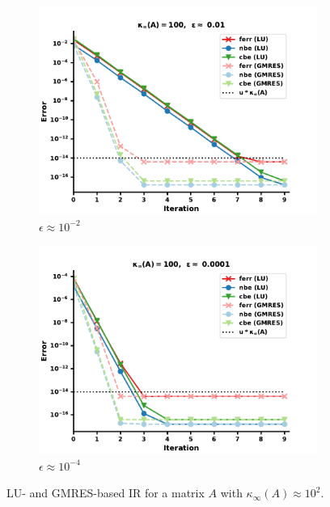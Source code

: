 \begin{figure}
\centering
\begin{subfigure}{.5\textwidth}
  \centering
  \includegraphics[width=\linewidth]{chapters/5_experiments/figures/LR512e0_0.pdf}
  \caption{$\epsilon \approx 10^{-2}$}
  \label{fig:lrir1_1}
\end{subfigure}%
\begin{subfigure}{.5\textwidth}
  \centering
  \includegraphics[width=\linewidth]{chapters/5_experiments/figures/LR512e0_1.pdf}
  \caption{$\epsilon \approx 10^{-4}$}
  \label{fig:lrir1_2}
\end{subfigure}
\caption[Low-Rank IR 1]{LU- and GMRES-based IR for a matrix $A$ with $\kappa_\infty(A) \approx 10^2$.}
\label{fig:lrir1}
\end{figure}

